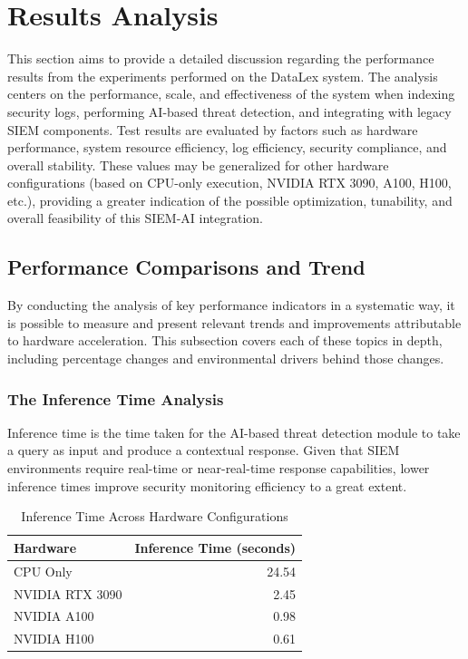 \section{Results Analysis}
\label{sec_results_analysis}

This section aims to provide a detailed discussion regarding the performance results from the experiments performed on the DataLex system. The analysis centers on the performance, scale, and effectiveness of the system when indexing security logs, performing AI-based threat detection, and integrating with legacy SIEM components. Test results are evaluated by factors such as hardware performance, system resource efficiency, log efficiency, security compliance, and overall stability. These values may be generalized for other hardware configurations (based on CPU-only execution, NVIDIA RTX 3090, A100, H100, etc.), providing a greater indication of the possible optimization, tunability, and overall feasibility of this SIEM-AI integration.

\subsection{Performance Comparisons and Trend}
\label{subsec_performance_comparisons_and_trend}

By conducting the analysis of key performance indicators in a systematic way, it is possible to measure and present relevant trends and improvements attributable to hardware acceleration. This subsection covers each of these topics in depth, including percentage changes and environmental drivers behind those changes.

\subsubsection{The Inference Time Analysis}
\label{subsubsec_inference_time_analysis}

Inference time is the time taken for the AI-based threat detection module to take a query as input and produce a contextual response. Given that SIEM environments require real-time or near-real-time response capabilities, lower inference times improve security monitoring efficiency to a great extent.

\begin{table}[h!]
\centering
\begin{tabular}{lr}
\hline
\textbf{Hardware} & \textbf{Inference Time (seconds)} \\
\hline
CPU Only & 24.54 \\
NVIDIA RTX 3090 & 2.45 \\
NVIDIA A100 & 0.98 \\
NVIDIA H100 & 0.61 \\
\hline
\end{tabular}
\caption{Inference Time Across Hardware Configurations}
\label{tab:inference-time-hardware}
\end{table}

